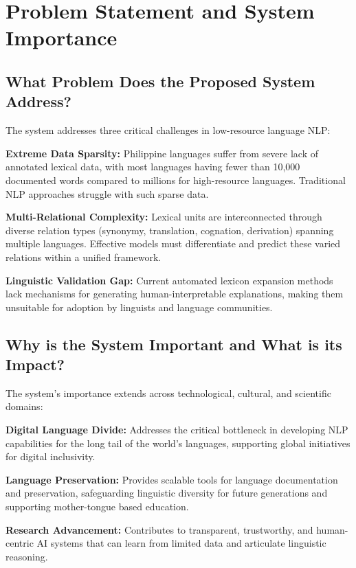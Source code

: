 \documentclass[11pt]{article}
\begin{document}
\section{Problem Statement and System Importance}

\subsection{What Problem Does the Proposed System Address?}

The system addresses three critical challenges in low-resource language NLP:

\textbf{Extreme Data Sparsity:} Philippine languages suffer from severe lack of annotated lexical data, with most languages having fewer than 10,000 documented words compared to millions for high-resource languages. Traditional NLP approaches struggle with such sparse data.

\textbf{Multi-Relational Complexity:} Lexical units are interconnected through diverse relation types (synonymy, translation, cognation, derivation) spanning multiple languages. Effective models must differentiate and predict these varied relations within a unified framework.

\textbf{Linguistic Validation Gap:} Current automated lexicon expansion methods lack mechanisms for generating human-interpretable explanations, making them unsuitable for adoption by linguists and language communities.

\subsection{Why is the System Important and What is its Impact?}

The system's importance extends across technological, cultural, and scientific domains:

\textbf{Digital Language Divide:} Addresses the critical bottleneck in developing NLP capabilities for the long tail of the world's languages, supporting global initiatives for digital inclusivity.

\textbf{Language Preservation:} Provides scalable tools for language documentation and preservation, safeguarding linguistic diversity for future generations and supporting mother-tongue based education.

\textbf{Research Advancement:} Contributes to transparent, trustworthy, and human-centric AI systems that can learn from limited data and articulate linguistic reasoning.
\end{document}
